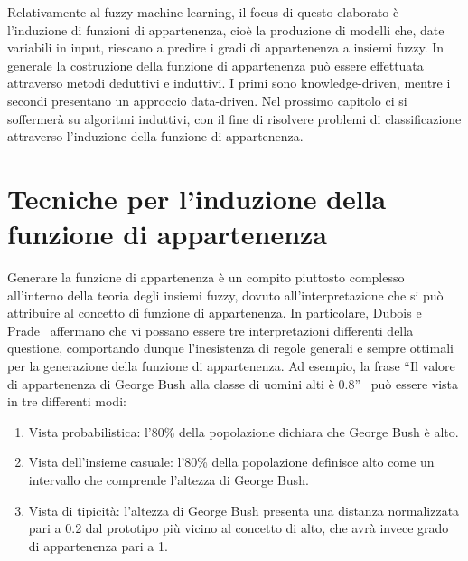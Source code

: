 \documentclass[11pt,  oneside, openany]{book}
\begin{document}
Relativamente al fuzzy machine learning, il focus di questo elaborato è l'induzione di funzioni di appartenenza, cioè la produzione di modelli che, date variabili in input, riescano a predire i gradi di appartenenza a insiemi fuzzy. In generale la costruzione della funzione di appartenenza può essere effettuata attraverso metodi deduttivi e induttivi. I primi sono knowledge-driven, mentre i secondi presentano un approccio data-driven. Nel prossimo capitolo ci si soffermerà su algoritmi induttivi, con il fine di risolvere problemi di classificazione attraverso l'induzione della funzione di appartenenza. 


	\newpage
	\chapter[Tecniche per l'induzione]{Tecniche per l'induzione della funzione di appartenenza}

Generare la funzione di appartenenza è un compito piuttosto complesso all'interno della teoria degli insiemi fuzzy, dovuto all'interpretazione che si può attribuire al concetto di funzione di appartenenza. In particolare, Dubois e Prade~\cite{membinterp} affermano che vi possano essere tre interpretazioni differenti della questione, comportando dunque l'inesistenza di regole generali e sempre ottimali per la generazione della funzione di appartenenza. Ad esempio, la frase ``Il valore di appartenenza di George Bush alla classe di uomini alti è 0.8''~\cite{membpaper} può essere vista in tre differenti modi:

\begin{enumerate}
\item Vista probabilistica: l'80\% della popolazione dichiara che George Bush è alto.
\item Vista dell'insieme casuale: l'80\% della popolazione definisce alto come un intervallo che comprende l'altezza di George Bush.
\item Vista di tipicità: l'altezza di George Bush presenta una distanza normalizzata pari a 0.2 dal prototipo più vicino al concetto di alto, che avrà invece grado di appartenenza pari a 1. 
\end{enumerate}
\end{document}
